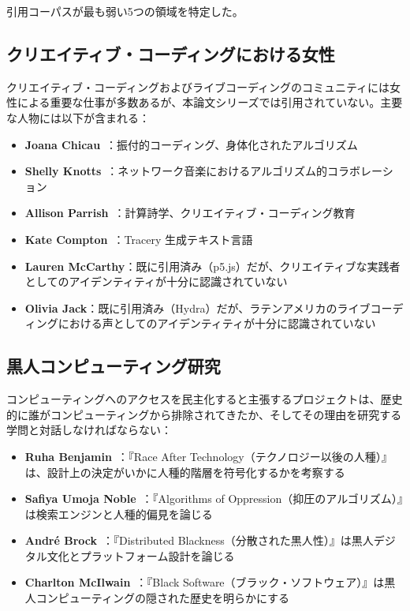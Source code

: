\documentclass[10pt,letterpaper,twocolumn]{article}
\begin{document}
引用コーパスが最も弱い5つの領域を特定した。

\subsection{クリエイティブ・コーディングにおける女性}

クリエイティブ・コーディングおよびライブコーディングのコミュニティには女性による重要な仕事が多数あるが、本論文シリーズでは引用されていない。主要な人物には以下が含まれる：

\begin{itemize}
  \item \textbf{Joana Chicau}~\citep{chicau2021choreo}：振付的コーディング、身体化されたアルゴリズム
  \item \textbf{Shelly Knotts}~\citep{knotts2015algorithmic}：ネットワーク音楽におけるアルゴリズム的コラボレーション
  \item \textbf{Allison Parrish}~\citep{parrish2015programming}：計算詩学、クリエイティブ・コーディング教育
  \item \textbf{Kate Compton}~\citep{compton2015tracery}：Tracery 生成テキスト言語
  \item \textbf{Lauren McCarthy}：既に引用済み（p5.js）だが、クリエイティブな実践者としてのアイデンティティが十分に認識されていない
  \item \textbf{Olivia Jack}：既に引用済み（Hydra）だが、ラテンアメリカのライブコーディングにおける声としてのアイデンティティが十分に認識されていない
\end{itemize}

\subsection{黒人コンピューティング研究}

コンピューティングへのアクセスを民主化すると主張するプロジェクトは、歴史的に誰がコンピューティングから排除されてきたか、そしてその理由を研究する学問と対話しなければならない：

\begin{itemize}
  \item \textbf{Ruha Benjamin}~\citep{benjamin2019race}：『Race After Technology（テクノロジー以後の人種）』は、設計上の決定がいかに人種的階層を符号化するかを考察する
  \item \textbf{Safiya Umoja Noble}~\citep{noble2018algorithms}：『Algorithms of Oppression（抑圧のアルゴリズム）』は検索エンジンと人種的偏見を論じる
  \item \textbf{Andr\'e Brock}~\citep{brock2020distributed}：『Distributed Blackness（分散された黒人性）』は黒人デジタル文化とプラットフォーム設計を論じる
  \item \textbf{Charlton McIlwain}~\citep{mcilwain2019black}：『Black Software（ブラック・ソフトウェア）』は黒人コンピューティングの隠された歴史を明らかにする
\end{itemize}
\end{document}
